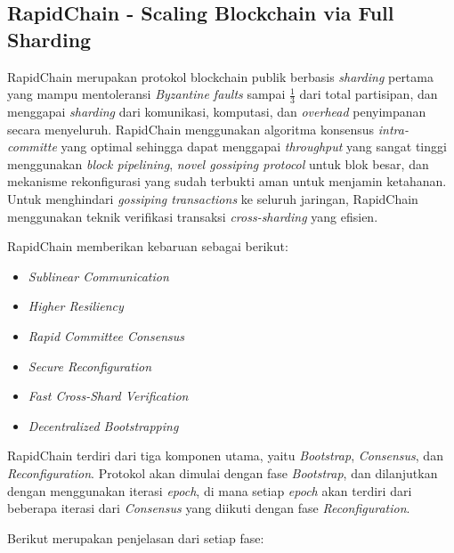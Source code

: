 \subsection{RapidChain - Scaling Blockchain via Full Sharding}
\label{subsec:rapidchain}

RapidChain merupakan protokol blockchain publik berbasis \textit{sharding} pertama yang mampu mentoleransi \textit{Byzantine faults} sampai $\frac{1}{3}$ dari total partisipan, dan menggapai \textit{sharding} dari komunikasi, komputasi, dan \textit{overhead} penyimpanan secara menyeluruh. RapidChain menggunakan algoritma konsensus \textit{intra-committe} yang optimal sehingga dapat menggapai \textit{throughput} yang sangat tinggi menggunakan \textit{block pipelining}, \textit{novel gossiping protocol} untuk blok besar, dan mekanisme rekonfigurasi yang sudah terbukti aman untuk menjamin ketahanan. Untuk menghindari \textit{gossiping transactions} ke seluruh jaringan, RapidChain menggunakan teknik verifikasi transaksi \textit{cross-sharding} yang efisien.

RapidChain memberikan kebaruan sebagai berikut:

\begin{itemize}
	\item \textit{Sublinear Communication}
	\item \textit{Higher Resiliency}
	\item \textit{Rapid Committee Consensus}
	\item \textit{Secure Reconfiguration}
	\item \textit{Fast Cross-Shard Verification}
	\item \textit{Decentralized Bootstrapping}
\end{itemize}

RapidChain terdiri dari tiga komponen utama, yaitu \textit{Bootstrap}, \textit{Consensus}, dan \textit{Reconfiguration}. Protokol akan dimulai dengan fase \textit{Bootstrap}, dan dilanjutkan dengan menggunakan iterasi \textit{epoch}, di mana setiap \textit{epoch} akan terdiri dari beberapa iterasi dari \textit{Consensus} yang diikuti dengan fase \textit{Reconfiguration}.

Berikut merupakan penjelasan dari setiap fase:

